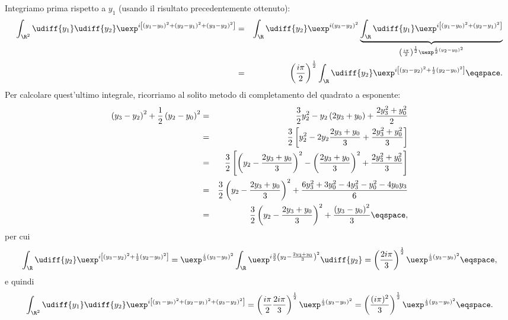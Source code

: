 Integriamo prima rispetto a $y_{1}$ (usando il risultato precedentemente
ottenuto):
\begin{eqnarray*}
\int_{\R^{2}} \udiff{y_{1}} \udiff{y_{2}} \uexp^{ i \left[ \left(y_{1} - y_{0}
\right)^{2} + \left( y_{2} - y_{1} \right)^{2} + \left( y_{3} - y_{2}
\right)^{2} \right]}   &=&
\int_{\R} \udiff{y_{2}} \uexp^{ i \left( y_{3} - y_{2} \right)^{2}} 
\underbrace{\int_{\R}
\udiff{y_{1}} \uexp^{ i \left[ \left( y_{1} - y_{0} \right)^{2} + \left( y_{2} -
y_{1} \right)^{2} \right]}}_{\left( \frac{i\pi}{2} \right)^{\frac{1}{2}} \uexp^{
\frac{i}{2} \left( y_{2} - y_{0}\right)^{2}}}  \\
&=& \left( \frac{i\pi} {2} \right)^{\frac{1}{2}} 
\int_{\R} \udiff{y_{2}} \uexp^{
i \left[ \left( y_{3} - y_{2} \right)^{2} + \frac{1}{2} \left( y_{2} - y_{0}
\right)^{2}\right]}  \eqspace .
\end{eqnarray*}
Per calcolare quest'ultimo integrale, ricorriamo al solito metodo di
completamento del  quadrato a esponente:
\begin{eqnarray*}
\left( y_{3} - y_{2} \right)^{2} + \frac{1}{2} \left( y_{2} - y_{0} \right)^{2}
&=& \frac{3}{2} y_{2}^{2} - y_{2} \left( 2 y_{3} + y_{0} \right) + \frac{2y_{3}^{2} +
y_{0}^{2}}{2}  \\
&=& \frac{3}{2} \left [ y_{2}^{2} - 2 y_{2} \frac{ 2y_{3} + y_{0}}{3} +
\frac{2y_{3}^{2} + y_{0}^{2}}{3} \right]  \\
&=& \frac{3}{2} \left[ \left( y_{2} - \frac{2y_{3} + y_{0}}{3} \right)^{2} -
\left( \frac{2y_{3} + y_{0}}{3} \right)^{2} + \frac{2y_{3}^{2} + y_{0}^{2}}{3}
\right]  \\
&=& \frac{3}{2} \left( y_{2} - \frac{2y_{3} + y_{0}}{3} \right)^{2}  +
\frac{6y_{3}^{2} + 3y_{0}^{2} - 4y_{3}^{2} -y_{0}^{2} - 4 y_{0} y_{3}}{6}  \\
&=& \frac{3}{2} \left( y_{2} - \frac{2y_{3} + y_{0} }{3} \right)^{2} + \frac{
\left( y_{3} - y_{0}\right)^{2}}{3}  \eqspace ,
\end{eqnarray*}
per cui
\begin{displaymath}
\int_{\R} \udiff{y_{2}} \uexp^{
i \left[ \left( y_{3} - y_{2} \right)^{2} + \frac{1}{2} \left( y_{2} - y_{0}
\right)^{2}\right]}  = \uexp^{ \frac{i}{3} \left( y_{3} - y_{0} \right)^{2}}
\int_{\R} \uexp^{ i \frac{3}{2} \left( y_{2} - \frac{2y_{3} + y_{0}}{3}
\right)^{2}} \udiff{y_{2}} = \left( \frac{2i\pi}{3} \right)^{\frac{1}{2}} \uexp^{
\frac{i}{3} \left( y_{3} - y_{0} \right)^{2}}  \eqspace ,
\end{displaymath}
e  quindi
\begin{displaymath}
\int_{\R^{2}} \udiff{y_{1}} \udiff{y_{2}} \uexp^{ i \left[ \left(y_{1} - y_{0}
\right)^{2} + \left( y_{2} - y_{1} \right)^{2} + \left( y_{3} - y_{2}
\right)^{2} \right]}  = \left( \frac{i\pi}{2} \frac{2i\pi}{3}
\right)^{\frac{1}{2}} \uexp^{ \frac{i}{3} \left( y_{3} - y_{0} \right)^{2}} =
\left( \frac{(i\pi)^{2}}{3} \right)^{\frac{1}{2}} \uexp^{ \frac{i}{3} \left(
y_{3} - y_{0} \right)^{2}} \eqspace .
\end{displaymath}
